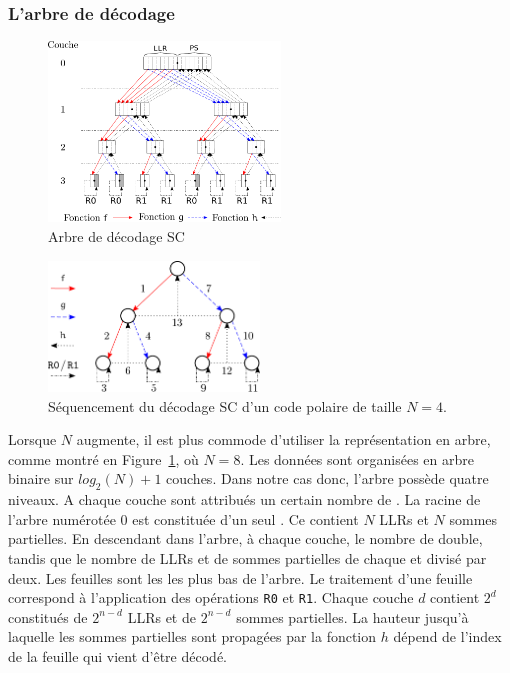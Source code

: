 \subsubsection{L'arbre de décodage}
\begin{figure}[t]
\centering
\includegraphics[width=0.55\textwidth]{main/ch1_fig/sc}
\caption{Arbre de décodage SC}
\label{fig:sc}
\end{figure}
\begin{figure}[t]
\centering
\includegraphics[width=0.5\textwidth]{main/ch1_fig/seq_sc}
\caption{Séquencement du décodage SC d'un code polaire de taille $N=4$.}
\label{fig:seq_sc}
\end{figure}
Lorsque $N$ augmente, il est plus commode d'utiliser la représentation en arbre, comme montré en Figure~\ref{fig:sc}, où $N=8$.
Les données sont organisées en arbre binaire sur $log_2(N) + 1$ couches. Dans notre cas donc, l'arbre possède quatre niveaux.
A chaque couche sont attribués un certain nombre de \noeuds.
La racine de l'arbre numérotée $0$ est constituée d'un seul \noeud.
Ce \noeud contient $N$ LLRs et $N$ sommes partielles.
En descendant dans l'arbre, à chaque couche, le nombre de \noeuds double, tandis que le nombre de LLRs et de sommes partielles de chaque \noeud et divisé par deux.
Les feuilles sont les \noeuds les plus bas de l'arbre.
Le traitement d'une feuille correspond à l'application des opérations \texttt{R0} et \texttt{R1}.
Chaque couche $d$ contient $2^d$ \noeuds constitués de $2^{n-d}$ LLRs et de $2^{n-d}$ sommes partielles. 
La hauteur jusqu'à laquelle les sommes partielles sont propagées par la fonction $h$ dépend de l'index de la feuille qui vient d'être décodé.

